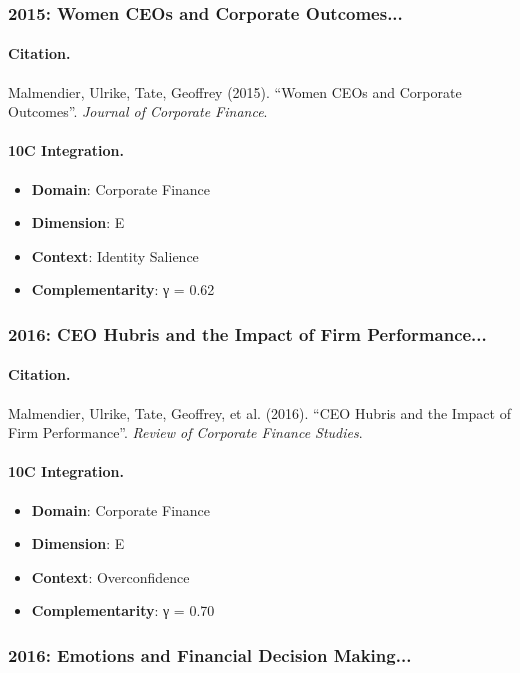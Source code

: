 \subsubsection{2015: Women CEOs and Corporate Outcomes...}

\paragraph{Citation.}
Malmendier, Ulrike, Tate, Geoffrey (2015). ``Women CEOs and Corporate Outcomes''. \textit{Journal of Corporate Finance}.

\paragraph{10C Integration.}
\begin{itemize}[nosep]
  \item \textbf{Domain}: Corporate Finance
  \item \textbf{Dimension}: E
  \item \textbf{Context}: Identity Salience
  \item \textbf{Complementarity}: γ = 0.62
\end{itemize}


\subsubsection{2016: CEO Hubris and the Impact of Firm Performance...}

\paragraph{Citation.}
Malmendier, Ulrike, Tate, Geoffrey, et al. (2016). ``CEO Hubris and the Impact of Firm Performance''. \textit{Review of Corporate Finance Studies}.

\paragraph{10C Integration.}
\begin{itemize}[nosep]
  \item \textbf{Domain}: Corporate Finance
  \item \textbf{Dimension}: E
  \item \textbf{Context}: Overconfidence
  \item \textbf{Complementarity}: γ = 0.70
\end{itemize}


\subsubsection{2016: Emotions and Financial Decision Making...}

